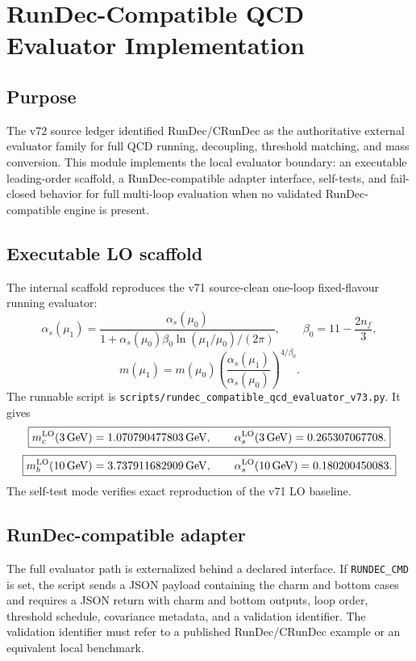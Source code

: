 
\section{RunDec-Compatible QCD Evaluator Implementation}
\label{sec:v73-rundec-compatible-evaluator}

\subsection{Purpose}
The v72 source ledger identified RunDec/CRunDec as the authoritative external evaluator family for full QCD running, decoupling, threshold matching, and mass conversion. This module implements the local evaluator boundary: an executable leading-order scaffold, a RunDec-compatible adapter interface, self-tests, and fail-closed behavior for full multi-loop evaluation when no validated RunDec-compatible engine is present.

\subsection{Executable LO scaffold}
The internal scaffold reproduces the v71 source-clean one-loop fixed-flavour running evaluator:
\[
\alpha_s(\mu_1)=\frac{\alpha_s(\mu_0)}{1+\alpha_s(\mu_0)\beta_0\ln(\mu_1/\mu_0)/(2\pi)},
\qquad
\beta_0=11-\frac{2n_f}{3},
\]
\[
 m(\mu_1)=m(\mu_0)\left(\frac{\alpha_s(\mu_1)}{\alpha_s(\mu_0)}\right)^{4/\beta_0}.
\]
The runnable script is \texttt{scripts/rundec\_compatible\_qcd\_evaluator\_v73.py}. It gives
\[
\boxed{m_c^{\rm LO}(3\,{\rm GeV})=1.070790477803\,{\rm GeV},\qquad \alpha_s^{\rm LO}(3\,{\rm GeV})=0.265307067708.}
\]
\[
\boxed{m_b^{\rm LO}(10\,{\rm GeV})=3.737911682909\,{\rm GeV},\qquad \alpha_s^{\rm LO}(10\,{\rm GeV})=0.180200450083.}
\]
The self-test mode verifies exact reproduction of the v71 LO baseline.

\subsection{RunDec-compatible adapter}
The full evaluator path is externalized behind a declared interface. If \texttt{RUNDEC\_CMD} is set, the script sends a JSON payload containing the charm and bottom cases and requires a JSON return with charm and bottom outputs, loop order, threshold schedule, covariance metadata, and a validation identifier. The validation identifier must refer to a published RunDec/CRunDec example or an equivalent local benchmark.

